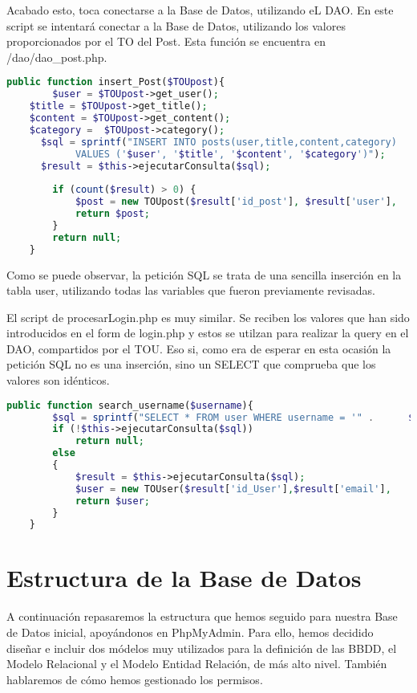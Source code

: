 \documentclass[12pt]{report}
\begin{document}
Acabado esto, toca conectarse a la Base de Datos, utilizando eL DAO. En este script se intentará conectar a la Base de Datos, utilizando los valores proporcionados por el TO del Post. Esta función se encuentra en /dao/dao\_post.php.
\newline
\begin{lstlisting}[language=PHP]
public function insert_Post($TOUpost){
		$user = $TOUpost->get_user();
    $title = $TOUpost->get_title();
    $content = $TOUpost->get_content();
    $category =  $TOUpost->category();
	  $sql = sprintf("INSERT INTO posts(user,title,content,category) 
		    VALUES ('$user', '$title', '$content', '$category')");
	  $result = $this->ejecutarConsulta($sql);
		
		if (count($result) > 0) {
			$post = new TOUpost($result['id_post'], $result['user'],   $result['title'], $result['content'], $result['id_cat']);			
			return $post;
		}
		return null;
	}
\end{lstlisting}
Como se puede observar, la petición SQL se trata de una sencilla inserción en la tabla user, utilizando todas las variables que fueron previamente revisadas.

El script de procesarLogin.php es muy similar. Se reciben los valores que han sido introducidos en el form de login.php y estos se utilzan para realizar la query en el DAO, compartidos por el TOU. Eso si, como era de esperar en esta ocasión la petición SQL no es una inserción, sino un SELECT que comprueba que los valores son idénticos.
\newline
\begin{lstlisting}[language=PHP]
public function search_username($username){
		$sql = sprintf("SELECT * FROM user WHERE username = '" .      $username. "'");
		if (!$this->ejecutarConsulta($sql))
			return null;
		else 
		{
			$result = $this->ejecutarConsulta($sql);
			$user = new TOUser($result['id_User'],$result['email'],      $result['password'],$result['username'],$result['premium']);
			return $user;
		}	
	}
\end{lstlisting}

\newpage
\section{Estructura de la Base de Datos}
A continuación repasaremos la estructura que hemos seguido para nuestra Base de Datos inicial, apoyándonos en PhpMyAdmin. Para ello, hemos decidido diseñar e incluir dos módelos muy utilizados para la definición de las BBDD, el Modelo Relacional y el Modelo Entidad Relación, de más alto nivel. También hablaremos de cómo hemos gestionado los permisos.
\newline
\end{document}
